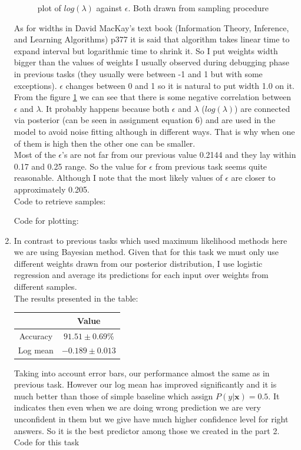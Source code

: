 \documentclass{article}
\newcommand{\vect}[1]{\boldsymbol{#1}} %
\begin{document}
\begin{enumerate}[label=(\alph*)]
\begin{figure}[htbp]
						 		\caption{plot of $log(\lambda)$ against $\epsilon$. Both drawn from sampling procedure}
						 		\label{fig:p2-3-b}
						 	\end{figure}
							As for widths in David MacKay's text book (Information Theory, Inference, and Learning Algorithms) p377 it is said that algorithm takes linear time to expand interval but logarithmic time to shrink it. So I put weights width bigger than the values of weights I usually observed during debugging phase in previous tasks (they usually were between -1 and 1 but with some exceptions). $\epsilon$ changes between 0 and 1 so it is natural to put width 1.0 on it.\\
						 	From the figure \ref{fig:p2-3-b} we can see that there is some negative correlation between $\epsilon$ and $\lambda$. It probably happens because both $\epsilon$ and $\lambda$ ($log(\lambda)$) are connected via posterior (can be seen in assignment equation 6) and are  used in the model to avoid noise fitting although in different ways. That is why when one of them is high then the other one can be smaller.\\
						 	Most of the  $\epsilon$'s are not far from our previous value 0.2144 and they lay within 0.17 and 0.25 range. So the value for $\epsilon$ from previous task seems quite reasonable. Although I note that the most likely values of $\epsilon$ are closer to approximately 0.205.\\

						 	Code to retrieve samples:
						 	
						 	Code for plotting:
						 	
						 	
						\item
							In contrast to previous tasks which used maximum likelihood methods here we are using Bayesian method. Given that for this task we must only use different weights drawn from our posterior distribution, I use logistic regression and average its predictions for each input over weights from different samples.\\ 
							The results presented in the table:
							\begin{center}
								\begin{tabular}{| c | c |}
									\hline
									\, & Value\\
									\hline
									Accuracy & $91.51 \pm 0.69\%$\\
									\hline
									Log mean & $-0.189 \pm 0.013$\\ 
									\hline
								\end{tabular}
							\end{center}
							Taking into account error bars, our performance almost the same as in previous task. However our log mean has improved significantly and it is much better than those of simple baseline which assign $P(y | \vect{x}) = 0.5$. It indicates then even when we are doing wrong prediction we are very unconfident in them but we give have much higher confidence level for right answers. So it is the best predictor among those we created in the part 2.\\
							Code for this task
							
					\end{enumerate}
\end{document}
